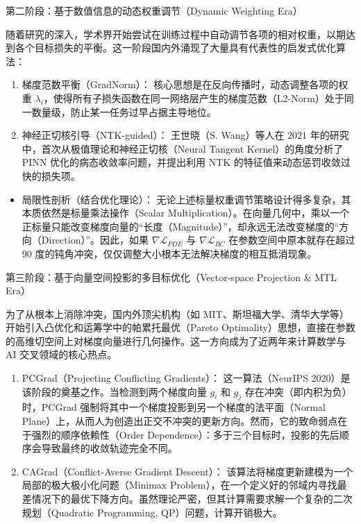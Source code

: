 \documentclass[UTF8,a4paper,12pt,fontset=none]{ctexart}
\begin{document}
第二阶段：基于数值信息的动态权重调节（Dynamic Weighting Era）

随着研究的深入，学术界开始尝试在训练过程中自动调节各项的相对权重，以期达到各个目标损失的平衡。这一阶段国内外涌现了大量具有代表性的启发式优化算法：

\begin{enumerate}
\item 梯度范数平衡（GradNorm）： 核心思想是在反向传播时，动态调整各项的权重 $\lambda_i$，使得所有子损失函数在同一网络层产生的梯度范数（L2-Norm）处于同一数量级，防止某一任务过早占据主导地位。
\item 神经正切核引导（NTK-guided）： 王世晓（S. Wang）等人在 2021 年的研究中，首次从极值理论和神经正切核（Neural Tangent Kernel）的角度分析了 PINN 优化的病态收敛率问题，并提出利用 NTK 的特征值来动态惩罚收敛过快的损失项。
\end{enumerate}
\begin{itemize}
\item 局限性剖析（结合优化理论）： 无论上述标量权重调节策略设计得多复杂，其本质依然是标量乘法操作（Scalar Multiplication）。在向量几何中，乘以一个正标量只能改变梯度向量的“长度（Magnitude）”，却永远无法改变梯度的“方向（Direction）”。因此，如果 $\nabla \mathcal{L}_{PDE}$ 与 $\nabla \mathcal{L}_{BC}$ 在参数空间中原本就存在超过 90 度的钝角冲突，仅仅调整大小根本无法解决梯度的相互抵消现象。
\end{itemize}

第三阶段：基于向量空间投影的多目标优化（Vector-space Projection \& MTL Era）

为了从根本上消除冲突，国内外顶尖机构（如 MIT、斯坦福大学、清华大学等）开始引入凸优化和运筹学中的帕累托最优（Pareto Optimality）思想，直接在参数的高维切空间上对梯度向量进行几何操作。这一方向成为了近两年来计算数学与 AI 交叉领域的核心热点。

\begin{enumerate}
\item PCGrad（Projecting Conflicting Gradients）： 这一算法（NeurIPS 2020）是该阶段的奠基之作。当检测到两个梯度向量 $g_i$ 和 $g_j$ 存在冲突（即内积为负）时，PCGrad 强制将其中一个梯度投影到另一个梯度的法平面（Normal Plane）上，从而人为创造出正交不冲突的更新方向。然而，它的致命弱点在于强烈的顺序依赖性（Order Dependence）：多于三个目标时，投影的先后顺序会导致最终的收敛轨迹完全不同。
\item CAGrad（Conflict-Averse Gradient Descent）： 该算法将梯度更新建模为一个局部的极大极小化问题（Minimax Problem），在一个定义好的邻域内寻找最差情况下的最优下降方向。虽然理论严密，但其计算需要求解一个复杂的二次规划（Quadratic Programming, QP）问题，计算开销极大。
\end{enumerate}
\end{document}

